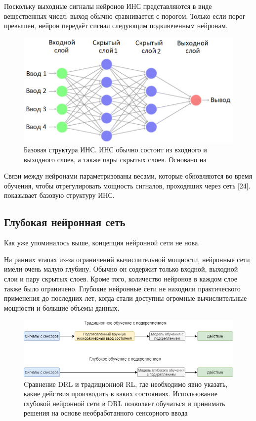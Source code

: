 Поскольку выходные сигналы нейронов ИНС представляются в виде вещественных чисел, выход обычно сравнивается с порогом. Только если порог превышен, нейрон передаёт сигнал следующим подключенным нейронам. 

\begin{figure}[ht!] 
	\center
	\includegraphics [scale=0.60] {my_folder/images/ch1/ANN.png}
	\caption{Базовая структура ИНС. ИНС обычно состоит из входного и выходного слоев, а также пары скрытых слоев. Основано на \cite{Khajanchi2003ArtificialNN} \cite{mitchell1997machine}} 
	\label{fig:ch1-ANN}
\end{figure}

Связи между нейронами параметризованы весами, которые обновляются во время обучения, чтобы отрегулировать мощность сигналов, проходящих через сеть [24].  показывает базовую структуру ИНС.


\subsection{Глубокая нейронная сеть}

Как уже упоминалось выше, концепция нейронной сети не нова.

На ранних этапах из-за ограничений вычислительной мощности, нейронные сети имели очень малую глубину. Обычно он содержит только входной, выходной слои и пару скрытых слоев. Кроме того, количество нейронов в каждом слое также было ограничено. Глубокие нейронные сети не находили практического применения до последних лет, когда стали доступны огромные вычислительные мощности и большие объемы данных.

\begin{figure}[ht!] 
	\center
	\includegraphics [scale=0.65] {my_folder/images/ch1/DRL-flow.png}
	\caption{Cравнение DRL и традиционной RL, где необходимо явно указать, какие действия производить в каких состояниях. Использование глубокой нейронной сети в DRL позволяет обучаться и принимать решения на основе необработанного сенсорного ввода} 
	\label{fig:DRL-flow}
\end{figure}

